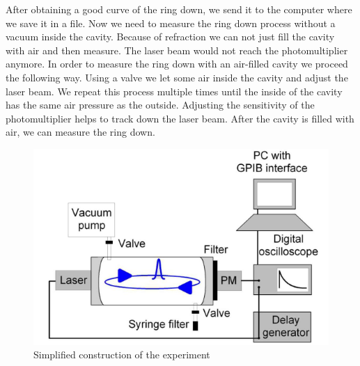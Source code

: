 \documentclass[12pt,a4paper]{article}
\begin{document}
After obtaining a good curve of the ring down, we send it to the computer where we save it in a file. Now we need to measure the ring down process without a vacuum inside the cavity. Because of refraction we can not just fill the cavity with air and then measure. The laser beam would not reach the photomultiplier anymore. In order to measure the ring down with an air-filled cavity we proceed the following way. Using a valve we let some air inside the cavity and adjust the laser beam. We repeat this process multiple times until the inside of the cavity has the same air pressure as the outside. Adjusting the sensitivity of the photomultiplier helps to track down the laser beam. After the cavity is filled with air, we can measure the ring down.

\begin{figure}[h]
	\includegraphics[scale = 0.7]{versuchsaufbau.png}
	\centering
	\caption{Simplified construction of the experiment}
	\label{aufbau}
\end{figure}
\end{document}
